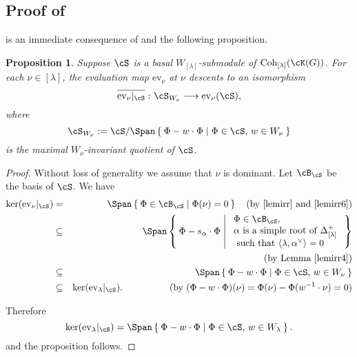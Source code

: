\documentclass[12pt,a4paper]{amsart}
\newcommand{\BS}{{\mathbb {S}}}
\newcommand{\CK}{{\mathcal {K}}}
\newcommand{\la}{\langle}
\newcommand{\ra}{\rangle}
\numberwithin{equation}{section}
\newtheorem{prop}[thm]{Proposition}
\theoremstyle{remark}
\def\Coh{\mathrm{Coh}}
\def\ev#1{{\mathrm{ev}_{#1}}}
\newcommand{\Lam}{{[\lambda]}}
\newcommand{\Grt}{\cK}
\begin{document}

\subsection{Proof of }
   is an immediate consequence of  and the following proposition.

\begin{prop}\label{prop:ev}
  Suppose  $\cS$ is a basal $W_{\Lam}$-submodule of $\Coh_{\Lam}(\cK(G))$.
  For each $\nu\in [\lambda]$, the evaluation map $\ev{\nu}$ at $\nu$
  descents to an isomorphism
  \[
    \overline{\ev{\nu}|_{\cS}} \, \colon \cS_{W_{\nu}} \longrightarrow \ev{\nu}(\cS),
  \]
  where
  \[
    \cS_{W_{\nu}}:=  \cS /\Span\Set{\Phi- w\cdot \Phi | \Phi\in \cS, \, w\in W_{\nu}}
  \]
  is the maximal $W_{\nu}$-invariant quotient of $\cS$.
\end{prop}
\begin{proof}
  \def\BS{\cB_{\cS}} Without loss of generality we assume that $\nu$ is
  dominant. Let $\BS$ be the basis of $\cS$.
  We have
  \begin{eqnarray*}
    \ker (\ev{\nu}|_{\cS})& = & \Span \Set{\Phi\in \BS| \Phi (\nu)=0}\quad \textrm{(by \Cref{lemirr} and \Cref{lemirr6}})\\
                          &  \subseteq & \Span \Set{\Phi - s_{\alpha}\cdot\Phi |
                                         \begin{array}{l} \Phi\in  \BS,\\
                                           \alpha  \text{ is a simple root of
                                           $\Delta_{\Lam}^+$}\\  \text{ such that
                                           }\la \lambda, \alpha^\vee\ra=0
                                         \end{array}}\\
                          &&\hspace{9.5em}     \textrm{(by Lemma \ref{lemirr4})} \\
                          & \subseteq &\Span\Set{\Phi- w\cdot \Phi | \Phi\in \cS, \, w\in W_{\nu}} \\
                          &  \subseteq &  \ker (\ev{\lambda}|_{\cS}). \hspace{5em} \text{(by $(\Phi-w\cdot \Phi)(\nu) = \Phi(\nu)-\Phi(w^{-1}\cdot \nu) = 0$)}\\
  \end{eqnarray*}

  Therefore
  \[
    \ker (\ev{\lambda}|_{\cS})=\Span\Set{\Phi- w \cdot\Phi \mid \Phi\in\cS, \, w\in W_{\lambda}}.
  \]
  and the proposition follows.
\end{proof}
\end{document}
